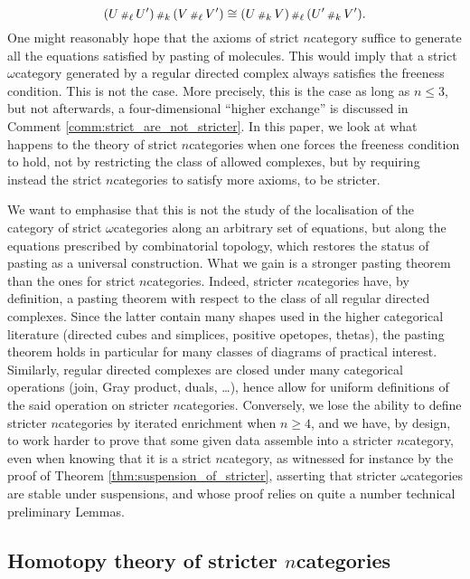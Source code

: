 \begin{equation*}
    (U \,{\scriptstyle\#}_{\ell}\, U') \,{\scriptstyle\#}_{k}\, (V \,{\scriptstyle\#}_{\ell}\, V') \cong (U \,{\scriptstyle\#}_{k}\, V) \,{\scriptstyle\#}_{\ell}\, (U' \,{\scriptstyle\#}_{k}\, V').
\end{equation*}
One might reasonably hope that the axioms of strict \( n \)\nbd category suffice to generate all the equations satisfied by pasting of molecules.
This would imply that a strict \( \omega \)\nbd category generated by a regular directed complex always satisfies the freeness condition. 
This is not the case.
More precisely, this is the case as long as \( n \le 3 \), but not afterwards, a four-dimensional ``higher exchange'' is discussed in Comment \ref{comm:strict_are_not_stricter}.
In this paper, we look at what happens to the theory of strict \( n \)\nbd categories when one forces the freeness condition to hold, not by restricting the class of allowed complexes, but by requiring instead the strict \( n \)\nbd categories to satisfy more axioms, to be stricter.

We want to emphasise that this is not the study of the localisation of the category of strict \( \omega \)\nbd categories along an arbitrary set of equations, but along the equations prescribed by combinatorial topology, which restores the status of pasting as a universal construction.
What we gain is a stronger pasting theorem than the ones for strict \( n \)\nbd categories.
Indeed, stricter \( n \)\nbd categories have, by definition, a pasting theorem with respect to the class of all regular directed complexes. 
Since the latter contain many shapes used in the higher categorical literature (directed cubes and simplices, positive opetopes, thetas), the pasting theorem holds in particular for many classes of diagrams of practical interest.   
Similarly, regular directed complexes are closed under many categorical operations (join, Gray product, duals, \dots), hence allow for uniform definitions of the said operation on stricter \( n \)\nbd categories.
Conversely, we lose the ability to define stricter \( n \)\nbd categories by iterated enrichment when \( n \geq 4 \), and we have, by design, to work harder to prove that some given data assemble into a stricter \( n \)\nbd category, even when knowing that it is a strict \( n \)\nbd category, as witnessed for instance by the proof of Theorem \ref{thm:suspension_of_stricter}, asserting that stricter \( \omega \)\nbd categories are stable under suspensions, and whose proof relies on quite a number technical preliminary Lemmas.  

\subsection*{Homotopy theory of stricter \( n \)\nbd categories}

